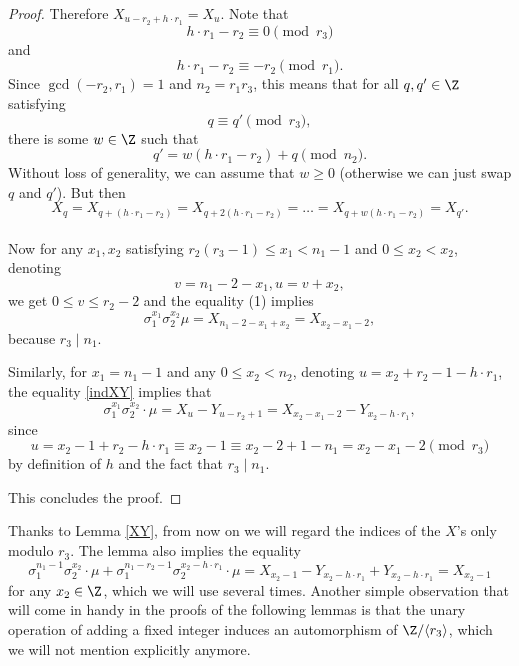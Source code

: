 \begin{proof}
Therefore $X_{u -r_2+h\cdot r_1}=X_u$. Note that $$h\cdot r_1-r_2\equiv 0 \pmod{r_3}$$ and $$h\cdot r_1-r_2\equiv -r_2\pmod{r_1}.$$ Since $\gcd(-r_2,r_1)=1$ and $n_2=r_1r_3$, this means that for all $q,q'\in\Z$ satisfying $$q\equiv q'\pmod{r_3},$$ there is some $w\in\Z$ such that $$q'=w(h\cdot r_1-r_2)+q \pmod{n_2}.$$ 
Without loss of generality, we can assume that $w\ge 0$ (otherwise we can just swap $q$ and $q'$). But then $$X_{q}=X_{q+(h\cdot r_1-r_2)}=X_{q+2(h\cdot r_1-r_2)}=\dots=X_{q+w(h\cdot r_1-r_2)}=X_{q'}.$$

\paragraph*{}
Now for any $x_1,x_2$ satisfying $r_2 (r_3-1) \le x_1 < n_1 - 1$ and $0\le x_2 <x_2$, denoting $$v = n_1 - 2 - x_1,  u = v + x_2,$$
we get  $0 \le v \le r_2 - 2$ and the equality (1) implies
$$\sigma_1 ^{x_1} \sigma_2 ^{x_2} \mu = X_{n_1-2-x_1+x_2} 
= X_{x_2-x_1-2},$$
because $r_3 \mid n_1$.

Similarly, for $x_1=n_1-1$ and any $0 \le x_2 <n_2$, denoting $u=x_2+r_2-1-h\cdot r_1$, the equality \eqref{indXY} implies that 
$$\sigma_1^{x_1}\sigma_2^{x_2}\cdot \mu=X_u-Y_{u-r_2+1}=X_{x_2-x_1-2}-Y_{x_2-h\cdot r_1},$$ since 
$$u = x_2-1+r_2-h\cdot r_1 \equiv x_2-1\equiv x_2-2+1-n_1=x_2-x_1-2 \pmod{r_3}$$
by definition of $h$ and the fact that $r_3 \mid n_1$.

This concludes the proof.
\end{proof}

Thanks to Lemma \ref{XY}, from now on we will regard the indices of the $X$'s only modulo $r_3$. %
The lemma also implies the equality
\begin{equation}\label{Ycancel}
\sigma_1^{n_1-1}\sigma_2^{x_2}\cdot \mu+\sigma_1^{n_1-r_2-1}\sigma_2^{x_2-h\cdot r_1}\cdot \mu=X_{x_2-1}-Y_{x_2-h\cdot r_1}+Y_{x_2-h\cdot r_1}= X_{x_2-1}
\end{equation}
for any $x_2\in\Z$, which we will use several times. Another simple observation that will come in handy in the proofs of the following lemmas is that the unary operation of adding a fixed integer induces an automorphism of $\Z/\langle r_3\rangle$, which we will not mention explicitly anymore.

